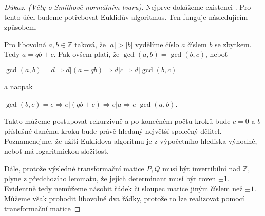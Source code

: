 \begin{proof}[Důkaz. (Věty o Smithově normálním tvaru)]
Nejprve dokážeme existenci \snf{}. Pro tento účel budeme potřebovat Euklidův
algoritmus. Ten funguje následujícím způsobem.

Pro libovolná $ a, b \in \mathbb{Z}$ taková, že $ |a| > |b| $ vydělíme číslo
$ a $ číslem $ b $ se zbytkem. Tedy $ a = qb + c $. Pak ovšem platí, že
$ \gcd(a, b) = \gcd(b, c) $, neboť

\begin{center}
$ \gcd(a, b) = d \Rightarrow d \vert (a - qb) \Rightarrow d \vert c \Rightarrow d \vert \gcd(b, c)$
\end{center}
a naopak
\begin{center}
$ \gcd(b, c) = e \Rightarrow e \vert (qb + c) \Rightarrow e \vert a \Rightarrow e \vert \gcd(a, b)$.
\end{center}
Takto můžeme postupovat rekurzivně a po konečném počtu kroků bude $ c = 0 $ a
$ b $ příslušné danému kroku bude právě hledaný největší společný dělitel.
Poznamenejme, že užití Euklidova algoritmu je z výpočetního hlediska výhodné, neboť
má logaritmickou složitost.

Dále, protože výsledné transformační matice $ P, Q $ musí být invertibilní nad $\mathbb{Z}$,
plyne z předchozího lemmatu, že jejich determinant musí být roven $ \pm 1 $.
Evidentně tedy nemůžeme násobit řádek či sloupec matice jiným číslem než $ \pm 1 $.
Můžeme však prohodit libovolné dva řádky, protože to lze realizovat pomocí
transformační matice


\end{proof}
